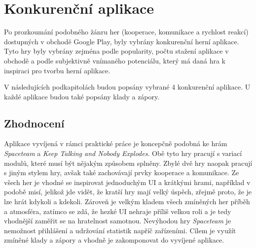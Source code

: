 \chapter{Konkurenční aplikace}
\label{chap:competitive-apps}

Po prozkoumání podobného žánru her
(kooperace, komunikace a rychlost reakcí)
dostupných v obchodě Google Play,
byly vybrány konkurenční herní aplikace.
Tyto hry byly vybrány zejména podle popularity,
počtu stažení aplikace v obchodě
a podle subjektivně vnímaného potenciálu,
který má daná hra k inspiraci pro tvorbu herní aplikace.

V následujících podkapitolách budou popsány vybrané 4 konkurenční aplikace.
U každé aplikace budou také popsány klady a zápory.






\section{Zhodnocení}

Aplikace vyvíjená v rámci praktické práce je koncepčně podobná ke hrám
\emph{Spaceteam} a \emph{Keep Talking and Nobody Explodes}.
Obě tyto hry pracují s variací modulů,
které musí být nějakým způsobem splněny.
Zbylé dvě hry naopak pracují s jiným stylem hry,
avšak také zachovávají prvky kooperace a komunikace.
Ze všech her je vhodné se inspirovat jednoduchým UI a krátkými hrami,
například v podobě misí,
jelikož jde vidět,
že kratší hry mají velký úspěch,
zřejmě proto,
že je lze hrát kdykoli a kdekoli.
Zároveň je velkým kladem všech zmíněných her příběh a atmosféra,
zatímco se zdá,
že hezké UI nehraje příliš velkou roli
a je tedy vhodnější zaměřit se na hratelnost samotnou.
Nevýhodou hry \emph{Spaceteam} je nemožnost přihlášení a udržování statistik
napříč zařízeními.
Cílem je využít zmíněné klady a zápory a vhodně je zakomponovat do vyvíjené
aplikace.
